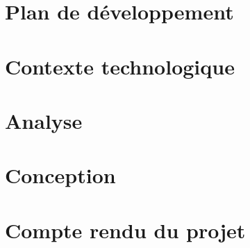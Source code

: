 \section{Plan de d\'eveloppement}
\label{sec:plan:devt}


\clearpage
\section{Contexte technologique}
\label{sec:contexte-techno}


\clearpage

\section{Analyse}
\label{sec:etat-avancement}

\clearpage

\section{Conception}
\label{sec:etat-avancement}
%
\clearpage

%

\section{Compte rendu du projet}
\label{sec:compterendu}

\clearpage
